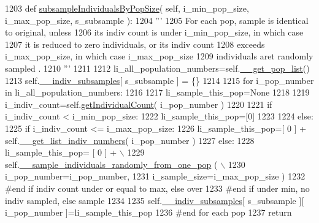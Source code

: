 \begin{DoxyCode}
1203     \textcolor{keyword}{def }\hyperlink{classnegui_1_1genepopfilemanager_1_1GenepopFileManager_afdad8528d7b19a8b2eeca447bb95a5a0}{subsampleIndividualsByPopSize}( self, i\_min\_pop\_size, i\_max\_pop\_size, 
      s\_subsample ):
1204         \textcolor{stringliteral}{'''}
1205 \textcolor{stringliteral}{        For each pop, sample is identical to original, unless }
1206 \textcolor{stringliteral}{        its indiv count is under i\_min\_pop\_size, in which case}
1207 \textcolor{stringliteral}{        it is reduced to zero individuals, or its indiv count}
1208 \textcolor{stringliteral}{        exceeds i\_max\_pop\_size, in which case i\_max\_pop\_size }
1209 \textcolor{stringliteral}{        individuals aret randomly sampled .}
1210 \textcolor{stringliteral}{        '''}
1211 
1212         li\_all\_population\_numbers=self.\hyperlink{classnegui_1_1genepopfilemanager_1_1GenepopFileManager_a0cd3178624c652968b4d319f12e5df6e}{\_\_get\_pop\_list}()
1213         self.\hyperlink{classnegui_1_1genepopfilemanager_1_1GenepopFileManager_a1e8379bcee4902ca9314ff53fcb71644}{\_\_indiv\_subsamples}[ s\_subsample ] = \{\}
1214 
1215         \textcolor{keywordflow}{for} i\_pop\_number \textcolor{keywordflow}{in} li\_all\_population\_numbers:
1216 
1217             li\_sample\_this\_pop=\textcolor{keywordtype}{None}
1218 
1219             i\_indiv\_count=self.\hyperlink{classnegui_1_1genepopfilemanager_1_1GenepopFileManager_a05e723069f5129b21a4d017c2a5317b0}{getIndividualCount}( i\_pop\_number )
1220 
1221             \textcolor{keywordflow}{if} i\_indiv\_count < i\_min\_pop\_size:
1222                 li\_sample\_this\_pop=[0]
1223 
1224             \textcolor{keywordflow}{else}:               
1225                 \textcolor{keywordflow}{if} i\_indiv\_count <= i\_max\_pop\_size:
1226                     li\_sample\_this\_pop=[ 0 ] + self.\hyperlink{classnegui_1_1genepopfilemanager_1_1GenepopFileManager_a4615769e9db90aa477aa3fd865408f54}{\_\_get\_list\_indiv\_numbers}( 
      i\_pop\_number )
1227                 \textcolor{keywordflow}{else}:
1228                     li\_sample\_this\_pop= [ 0 ] + \(\backslash\)
1229                             self.\hyperlink{classnegui_1_1genepopfilemanager_1_1GenepopFileManager_a9818467c9cb40f8e1de0c6cc7f52e263}{\_\_sample\_individuals\_randomly\_from\_one\_pop}
      ( \(\backslash\)
1230                                                                  i\_pop\_number=i\_pop\_number,
1231                                                                  i\_sample\_size=i\_max\_pop\_size )
1232                 \textcolor{comment}{#end if indiv count under or equal to max, else over}
1233             \textcolor{comment}{#end if under min, no indiv sampled, else sample}
1234 
1235             self.\hyperlink{classnegui_1_1genepopfilemanager_1_1GenepopFileManager_a1e8379bcee4902ca9314ff53fcb71644}{\_\_indiv\_subsamples}[ s\_subsample ][ i\_pop\_number ]=li\_sample\_this\_pop
1236         \textcolor{comment}{#end for each pop}
1237         \textcolor{keywordflow}{return}
\end{DoxyCode}
